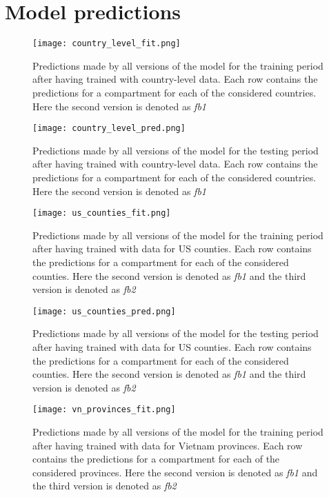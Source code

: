\appendix

\chapter{Model predictions}

\begin{figure}[!htb]
    \centering
    \texttt{[image: country\_level\_fit.png]}
    \caption{Predictions made by all versions of the model for the training period after having trained with country-level data. Each row contains the predictions for a compartment for each of the considered countries. Here the second version is denoted as \textit{fb1}}
    \label{fig:fit-country-level}
\end{figure}

\begin{figure}[!htb]
    \centering
    \texttt{[image: country\_level\_pred.png]}
    \caption{Predictions made by all versions of the model for the testing period after having trained with country-level data. Each row contains the predictions for a compartment for each of the considered countries. Here the second version is denoted as \textit{fb1}}
    \label{fig:pred-country-level}
\end{figure}

\begin{figure}[!htb]
    \centering
    \texttt{[image: us\_counties\_fit.png]}
    \caption{Predictions made by all versions of the model for the training period after having trained with data for \gls{US} counties. Each row contains the predictions for a compartment for each of the considered counties. Here the second version is denoted as \textit{fb1} and the third version is denoted as \textit{fb2}}
    \label{fig:fit-us-counties}
\end{figure}

\begin{figure}[!htb]
    \centering
    \texttt{[image: us\_counties\_pred.png]}
    \caption{Predictions made by all versions of the model for the testing period after having trained with data for \gls{US} counties. Each row contains the predictions for a compartment for each of the considered counties. Here the second version is denoted as \textit{fb1} and the third version is denoted as \textit{fb2}}
    \label{fig:pred-us-counties}
\end{figure}

\begin{figure}[!htb]
    \centering
    \texttt{[image: vn\_provinces\_fit.png]}
    \caption{Predictions made by all versions of the model for the training period after having trained with data for Vietnam provinces. Each row contains the predictions for a compartment for each of the considered provinces. Here the second version is denoted as \textit{fb1} and the third version is denoted as \textit{fb2}}
    \label{fig:fit-vn-provinces}
\end{figure}

